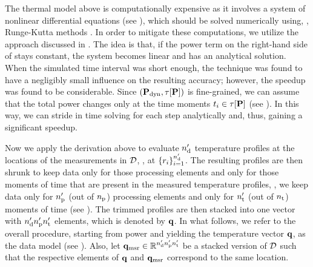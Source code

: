 



The thermal model above is computationally expensive as it involves a system of nonlinear differential equations (see ), which should be solved numerically using, \eg, Runge-Kutta methods \cite{press2007}. In order to mitigate these computations, we utilize the approach discussed in \cite{ukhov2012}.
The idea is that, if the power term on the right-hand side of  stays constant, the system becomes linear and has an analytical solution. When the simulated time interval was short enough, the technique was found to have a negligibly small influence on the resulting accuracy; however, the speedup was found to be considerable.
Since $(\mathbf{P}_{\text{dyn}}, \tau[\mathbf{P}])$ is fine-grained, we can assume that the total power changes only at the time moments $t_i \in \tau[\mathbf{P}]$ (see ). In this way, we can stride in time solving  for each step analytically and, thus, gaining a significant speedup.

Now we apply the derivation above to evaluate ${n_\text{d}'}$ temperature profiles at the locations of the measurements in $\mathcal{D}$, \ie, at $\{ r_i \}_{i = 1}^{n_\text{d}'}$.
The resulting profiles are then shrunk to keep data only for those processing elements and only for those moments of time that are present in the measured temperature profiles, \ie, we keep data only for ${n_\text{p}'}$ (out of ${n_\text{p}}$) processing elements and only for ${n_\text{t}'}$ (out of ${n_\text{t}}$) moments of time (see ).
The trimmed profiles are then stacked into one vector with ${n_\text{d}'} {n_\text{p}'} {n_\text{t}'}$ elements, which is denoted by $\mathbf{q}$.
In what follows, we refer to the overall procedure, starting from power and yielding the temperature vector $\mathbf{q}$, as the data model (see ).
Also, let $\mathbf{q}_{\text{msr}} \in \mathbb{R}^{{n_\text{d}'} {n_\text{p}'} {n_\text{t}'}}$ be a stacked version of $\mathcal{D}$ such that the respective elements of $\mathbf{q}$ and $\mathbf{q}_{\text{msr}}$ correspond to the same location.
